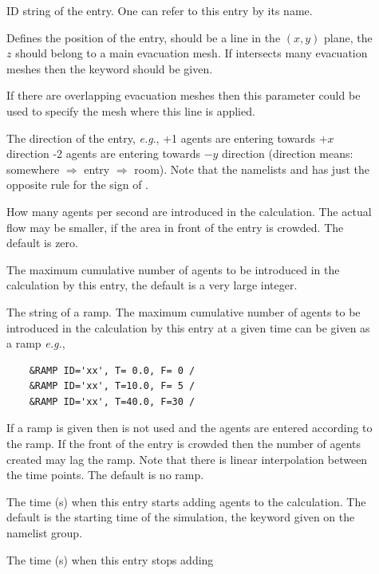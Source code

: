 \documentclass[12pt,a4paper,final,twoside]{stylevk}
\begin{document}
\begin{description}
%
\item[] ID string of the entry.  One can refer to this entry
  by its name.
%
\item[] Defines the position of the entry, should be a line
  in the $(x,y)$ plane, the $z$ should belong to a main evacuation
  mesh.  If  intersects many evacuation meshes then the
  keyword  should be given.
%
\item[] If there are overlapping evacuation meshes
  then this parameter could be used to specify the mesh where this
   line is applied.
%
\item[] The direction of the entry, \emph{e.g}., +1 agents
  are entering towards $+x$ direction -2 agents are entering towards
  $-y$ direction (direction means: somewhere $\Rightarrow$ entry
  $\Rightarrow$ room).  Note that the namelists  and
   has just the opposite rule for the sign of .
%
\item[] How many agents per second are introduced in
  the calculation. The actual flow may be smaller, if the area in
  front of the entry is crowded.  The default is zero.
%
\item[] The maximum cumulative number of agents to
  be introduced in the calculation by this entry, the default is a
  very large integer.
%
\item[] The  string of a ramp.  The
  maximum cumulative number of agents to be introduced in the
  calculation by this entry at a given time can be given as a ramp
  \emph{e.g.}, 
\begin{verbatim}
    &RAMP ID='xx', T= 0.0, F= 0 /
    &RAMP ID='xx', T=10.0, F= 5 /
    &RAMP ID='xx', T=40.0, F=30 /
\end{verbatim}
  If a ramp is given then  is not used and the agents
  are entered according to the ramp.  If the front of the entry is
  crowded then the number of agents created may lag the ramp.
  Note that there is linear interpolation between the time points.
  The default is no ramp.
%
\item[] The time (s) when this entry starts adding
  agents to the calculation.  The default is the starting time of the
  simulation, the  keyword given on the  
  namelist group.
%
\item[] The time (s) when this entry stops adding

\end{description}
\end{document}

